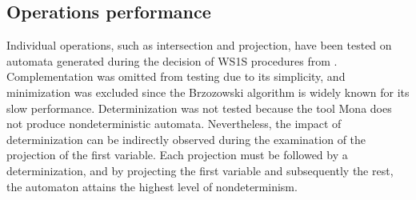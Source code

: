 \documentclass[pdflatex,sn-mathphys-num]{sn-jnl}%
\theoremstyle{thmstyleone}%
\theoremstyle{thmstyletwo}%
\theoremstyle{thmstylethree}%
\begin{document}
    \subsection{Operations performance}
        Individual operations, such as intersection and projection, have been tested on automata generated during the decision of WS1S procedures from \cite{Bednar}. Complementation was omitted from testing due to its simplicity, and minimization was excluded since the Brzozowski algorithm is widely known for its slow performance. Determinization was not tested because the tool Mona does not produce nondeterministic automata. Nevertheless, the impact of determinization can be indirectly observed during the examination of the projection of the first variable. Each projection must be followed by a determinization, and by projecting the first variable and subsequently the rest, the automaton attains the highest level of nondeterminism.
\end{document}
